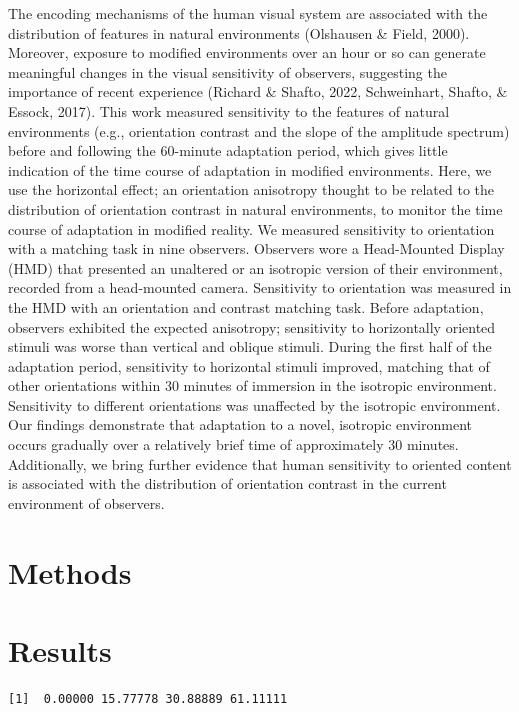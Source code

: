 \documentclass[
  12pt,
  letterpaper,
  DIV=11,
  numbers=noendperiod]{scrartcl}
\begin{document}
The encoding mechanisms of the human visual system are associated with
the distribution of features in natural environments (Olshausen \&
Field, 2000). Moreover, exposure to modified environments over an hour
or so can generate meaningful changes in the visual sensitivity of
observers, suggesting the importance of recent experience (Richard \&
Shafto, 2022, Schweinhart, Shafto, \& Essock, 2017). This work measured
sensitivity to the features of natural environments (e.g., orientation
contrast and the slope of the amplitude spectrum) before and following
the 60-minute adaptation period, which gives little indication of the
time course of adaptation in modified environments. Here, we use the
horizontal effect; an orientation anisotropy thought to be related to
the distribution of orientation contrast in natural environments, to
monitor the time course of adaptation in modified reality. We measured
sensitivity to orientation with a matching task in nine observers.
Observers wore a Head-Mounted Display (HMD) that presented an unaltered
or an isotropic version of their environment, recorded from a
head-mounted camera. Sensitivity to orientation was measured in the HMD
with an orientation and contrast matching task. Before adaptation,
observers exhibited the expected anisotropy; sensitivity to horizontally
oriented stimuli was worse than vertical and oblique stimuli. During the
first half of the adaptation period, sensitivity to horizontal stimuli
improved, matching that of other orientations within 30 minutes of
immersion in the isotropic environment. Sensitivity to different
orientations was unaffected by the isotropic environment. Our findings
demonstrate that adaptation to a novel, isotropic environment occurs
gradually over a relatively brief time of approximately 30 minutes.
Additionally, we bring further evidence that human sensitivity to
oriented content is associated with the distribution of orientation
contrast in the current environment of observers.

\section{Methods}\label{methods}

\section{Results}\label{results}

\begin{verbatim}
[1]  0.00000 15.77778 30.88889 61.11111
\end{verbatim}
\end{document}
